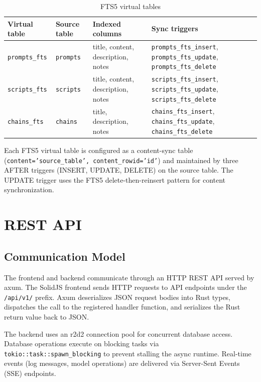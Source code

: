 \documentclass[a4paper, 11pt, oneside]{report}
\begin{document}
\begin{table}[H]
  \centering
  \caption{FTS5 virtual tables}
  \label{tab:fts5}
  \begin{tabularx}{\textwidth}{l l l X}
    \toprule
    \textbf{Virtual table} & \textbf{Source table} & \textbf{Indexed columns} & \textbf{Sync triggers} \\
    \midrule
    \texttt{prompts\_fts} & \texttt{prompts} & title, content, description, notes &
      \texttt{prompts\_fts\_insert}, \texttt{prompts\_fts\_update}, \texttt{prompts\_fts\_delete} \\
    \texttt{scripts\_fts} & \texttt{scripts} & title, content, description, notes &
      \texttt{scripts\_fts\_insert}, \texttt{scripts\_fts\_update}, \texttt{scripts\_fts\_delete} \\
    \texttt{chains\_fts}  & \texttt{chains}  & title, description, notes &
      \texttt{chains\_fts\_insert}, \texttt{chains\_fts\_update}, \texttt{chains\_fts\_delete} \\
    \bottomrule
  \end{tabularx}
\end{table}

Each FTS5 virtual table is configured as a content-sync table
(\texttt{content='source\_table', content\_rowid='id'}) and maintained by
three AFTER triggers (INSERT, UPDATE, DELETE) on the source table.  The
UPDATE trigger uses the FTS5 delete-then-reinsert pattern for content
synchronization.


\chapter{REST API}
\label{ch:rest-api}

\section{Communication Model}
\label{sec:api-model}

The frontend and backend communicate through an HTTP REST API served by
axum.  The SolidJS frontend sends HTTP requests to API endpoints under
the \texttt{/api/v1/} prefix.  Axum deserializes JSON request bodies
into Rust types, dispatches the call to the registered handler function,
and serializes the Rust return value back to JSON.

The backend uses an r2d2 connection pool for concurrent database access.
Database operations execute on blocking tasks via
\texttt{tokio::task::spawn\_blocking} to prevent stalling the async
runtime.  Real-time events (log messages, model operations) are delivered
via Server-Sent Events (SSE) endpoints.
\end{document}
